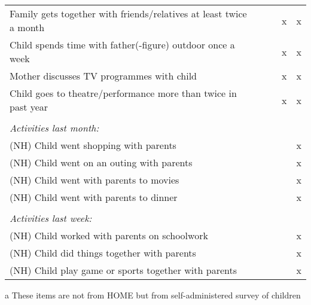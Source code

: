 {\begin{threeparttable}
\begin{tabularx}{\textwidth}{|l| *{4}{Y|}}
		\hspace{3mm} Family gets together with friends/relatives at least twice a month & & & x & x \\
		\hspace{3mm} Child spends time with father(-figure) outdoor once a week & & & x & x \\
		\hspace{3mm} Mother discusses TV programmes with child & & & x & x \\
		\hspace{3mm} Child goes to theatre/performance more than twice in past year & & & x & x \\
		& & & & \\
		\textit{Activities last month:} & & & & \\
		\hspace{3mm} (NH) Child went shopping with parents & & & & x \\
		\hspace{3mm} (NH) Child went on an outing with parents & & & & x \\
		\hspace{3mm} (NH) Child went with parents to movies & & & & x \\
		\hspace{3mm} (NH) Child went with parents to dinner& & & & x \\
		& & & & \\
		\textit{Activities last week:} & & & & \\
		\hspace{3mm} (NH) Child worked with parents on schoolwork & & & & x  \\
		\hspace{3mm} (NH) Child did things together with parents & & & & x  \\	
		\hspace{3mm} (NH) Child play game or sports together with parents & & & & x  \\
		\hline			
	\end{tabularx}
	\begin{tablenotes}\footnotesize
		\item[a] These items are not from HOME but from self-administered survey of children
	\end{tablenotes}
\end{threeparttable}
}